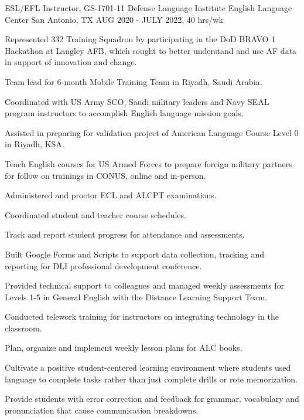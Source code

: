 \begin{cventries}
\cventry
{ESL/EFL Instructor, GS-1701-11} %
{Defense Language Institute English Language Center} %
{San Antonio, TX} %
{AUG 2020 - JULY 2022, 40 hrs/wk} %
{ %
\begin{cvitems}
\item {Represented 332 Training Squadron by participating in the DoD BRAVO 1 Hackathon at Langley AFB, which sought to better understand and use AF data in support of innovation and change.}
\item {Team lead for 6-month Mobile Training Team in Riyadh, Saudi Arabia.}
\item {Coordinated with US Army SCO, Saudi military leaders and Navy SEAL program instructors to accomplish English language mission goals.}
\item {Assisted in preparing for validation project of American Language Course Level 0 in Riyadh, KSA.}
\item {Teach English courses for US Armed Forces to prepare foreign military partners for follow on trainings in CONUS, online and in-person.}
\item {Administered and proctor ECL and ALCPT examinations.}
\item {Coordinated student and teacher course schedules.}
\item {Track and report student progress for attendance and assessments.}
\item {Built Google Forms and Scripts to support data collection, tracking and reporting for DLI professional development conference.}
\item {Provided technical support to colleagues and managed weekly assessments for Levels 1-5 in General English with the Distance Learning Support Team.}
\item {Conducted telework training for instructors on integrating technology in the classroom.}
\item {Plan, organize and implement weekly lesson plans for ALC books.}
\item {Cultivate a positive student-centered learning environment where students used language to complete tasks rather than just complete drills or rote memorization.}
\item {Provide students with error correction and feedback for grammar, vocabulary and pronunciation that cause communication breakdowns.}
\end{cvitems}
}


\end{cventries}
